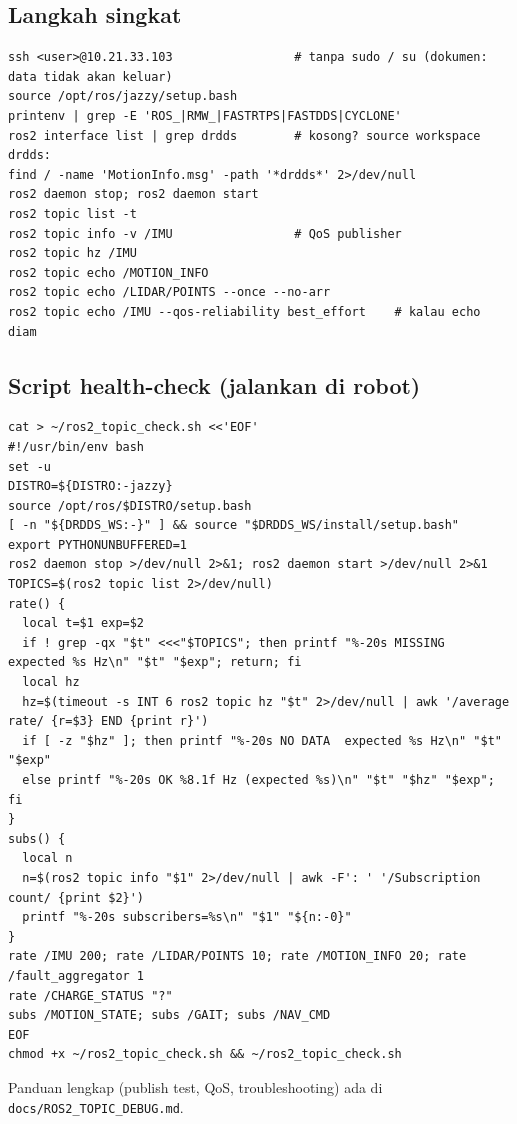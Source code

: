 \documentclass[11pt,a4paper]{article}
\newcommand{\code}[1]{\texttt{#1}}
\begin{document}
\subsection*{Langkah singkat}
\begin{lstlisting}
ssh <user>@10.21.33.103                 # tanpa sudo / su (dokumen: data tidak akan keluar)
source /opt/ros/jazzy/setup.bash
printenv | grep -E 'ROS_|RMW_|FASTRTPS|FASTDDS|CYCLONE'
ros2 interface list | grep drdds        # kosong? source workspace drdds:
find / -name 'MotionInfo.msg' -path '*drdds*' 2>/dev/null
ros2 daemon stop; ros2 daemon start
ros2 topic list -t
ros2 topic info -v /IMU                 # QoS publisher
ros2 topic hz /IMU
ros2 topic echo /MOTION_INFO
ros2 topic echo /LIDAR/POINTS --once --no-arr
ros2 topic echo /IMU --qos-reliability best_effort    # kalau echo diam
\end{lstlisting}

\subsection*{Script health-check (jalankan di robot)}
\begin{lstlisting}
cat > ~/ros2_topic_check.sh <<'EOF'
#!/usr/bin/env bash
set -u
DISTRO=${DISTRO:-jazzy}
source /opt/ros/$DISTRO/setup.bash
[ -n "${DRDDS_WS:-}" ] && source "$DRDDS_WS/install/setup.bash"
export PYTHONUNBUFFERED=1
ros2 daemon stop >/dev/null 2>&1; ros2 daemon start >/dev/null 2>&1
TOPICS=$(ros2 topic list 2>/dev/null)
rate() {
  local t=$1 exp=$2
  if ! grep -qx "$t" <<<"$TOPICS"; then printf "%-20s MISSING  expected %s Hz\n" "$t" "$exp"; return; fi
  local hz
  hz=$(timeout -s INT 6 ros2 topic hz "$t" 2>/dev/null | awk '/average rate/ {r=$3} END {print r}')
  if [ -z "$hz" ]; then printf "%-20s NO DATA  expected %s Hz\n" "$t" "$exp"
  else printf "%-20s OK %8.1f Hz (expected %s)\n" "$t" "$hz" "$exp"; fi
}
subs() {
  local n
  n=$(ros2 topic info "$1" 2>/dev/null | awk -F': ' '/Subscription count/ {print $2}')
  printf "%-20s subscribers=%s\n" "$1" "${n:-0}"
}
rate /IMU 200; rate /LIDAR/POINTS 10; rate /MOTION_INFO 20; rate /fault_aggregator 1
rate /CHARGE_STATUS "?"
subs /MOTION_STATE; subs /GAIT; subs /NAV_CMD
EOF
chmod +x ~/ros2_topic_check.sh && ~/ros2_topic_check.sh
\end{lstlisting}
Panduan lengkap (publish test, QoS, troubleshooting) ada di \code{docs/ROS2\_TOPIC\_DEBUG.md}.
\end{document}
